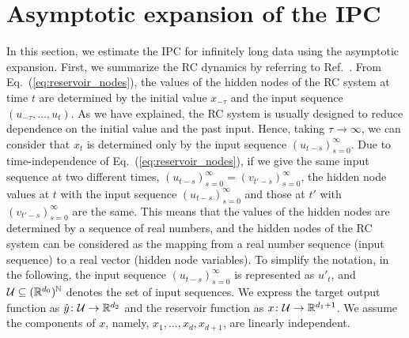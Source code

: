 \documentclass{article}
\begin{document}
\section{Asymptotic expansion of the IPC}
\begin{comment}
・性能はただの２乗ノルムではなく、正規化された２乗ノルムを使う方がよい。理由は Dumbre 参考。
・total IPC の上限や、既存の推定法について紹介。Dumbre 参考。
\end{comment}
In this section, we estimate the IPC for infinitely long data using the asymptotic expansion. 
First, we summarize the RC dynamics by referring to Ref.~\cite{dambre2012information, grigoryeva2018echo, gonon2019reservoir}. 
From Eq.~(\ref{eq:reservoir_nodes}), the values of the hidden nodes of the RC system at time $t$ are determined by the initial value $x_{-\tau}$ and the input sequence $(u_{-\tau}, \ldots, u_t)$. 
As we have explained, the RC system is usually designed to reduce dependence on the initial value and the past input. 
Hence, taking $\tau \to \infty$, we can consider that $x_t$ is determined only by the input sequence $(u_{t - s})_{s=0}^\infty$. 
Due to time-independence of Eq.~(\ref{eq:reservoir_nodes}), if we give the same input sequence at two different times, $(u_{t-s})_{s=0}^\infty = (v_{t'-s})_{s=0}^\infty$, the hidden node values at $t$ with the input sequence $(u_{t-s})_{s=0}^\infty$ and those at $t'$ with $(v_{t'-s})_{s=0}^\infty$ are the same. 
This means that the values of the hidden nodes are determined by a sequence of real numbers, and the hidden nodes of the RC system can be considered as the mapping from a real number sequence (input sequence) to a real vector (hidden node variables). 
To simplify the notation, in the following, the input sequence $(u_{t - s})_{s=0}^\infty$ is represented as $u'_t$, and ${\cal U} \subseteq (\mathbb{R}^{d_0})^{\mathbb{N}}$ denotes the set of input sequences. 
We express the target output function as $\hat{y} \colon {\cal U} \to \mathbb{R}^{d_2}$ and the reservoir function as $x \colon {\cal U} \to \mathbb{R}^{d_1+1}$. 
We assume the components of $x$, namely, $x_1, \ldots, x_{d}, x_{d+1}$, are linearly independent. 
\end{document}
